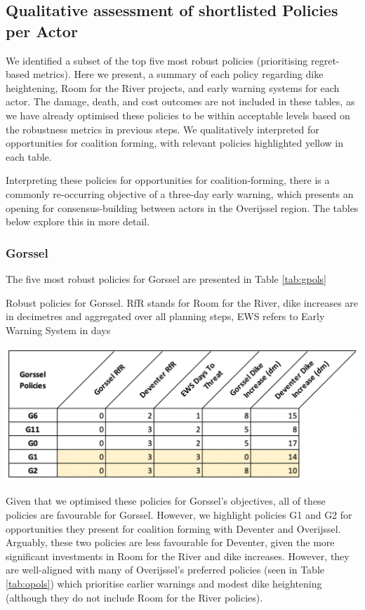\subsection{Qualitative assessment of shortlisted Policies per Actor}
We identified a subset of the top five most robust policies (prioritising regret-based metrics). Here we present, a summary of each policy regarding dike heightening, Room for the River projects, and early warning systems for each actor. The damage, death, and cost outcomes are not included in these tables, as we have already optimised these policies to be within acceptable levels based on the robustness metrics in previous steps. We qualitatively interpreted for opportunities for coalition forming, with relevant policies highlighted yellow in each table.

Interpreting these policies for opportunities for coalition-forming, there is a commonly re-occurring objective of a three-day early warning, which presents an opening for consensus-building between actors in the Overijssel region. The tables below explore this in more detail.

\subsubsection{Gorssel}
The five most robust policies for Gorssel are presented in Table \ref{tab:gpols}

\begin{table}[h!]
  \centering
  \captionsetup{justification=centering,margin=2cm}
  \caption{Robust policies for Gorssel. RfR stands for Room for the River, dike increases are in decimetres and aggregated over all planning steps, EWS refers to Early Warning System in days}
  \label{tab:gpols}
  \includegraphics[width=0.8\linewidth]{report/figures/gpols.png}
\end{table}

\noindent Given that we optimised these policies for Gorssel's objectives, all of these policies are favourable for Gorssel. However, we highlight policies G1 and G2 for opportunities they present for coalition forming with Deventer and Overijssel. Arguably, these two policies are less favourable for Deventer, given the more significant investments in Room for the River and dike increases. However, they are well-aligned with many of Overijssel's preferred policies (seen in Table \ref{tab:opols}) which prioritise earlier warnings and modest dike heightening (although they do not include Room for the River policies).

